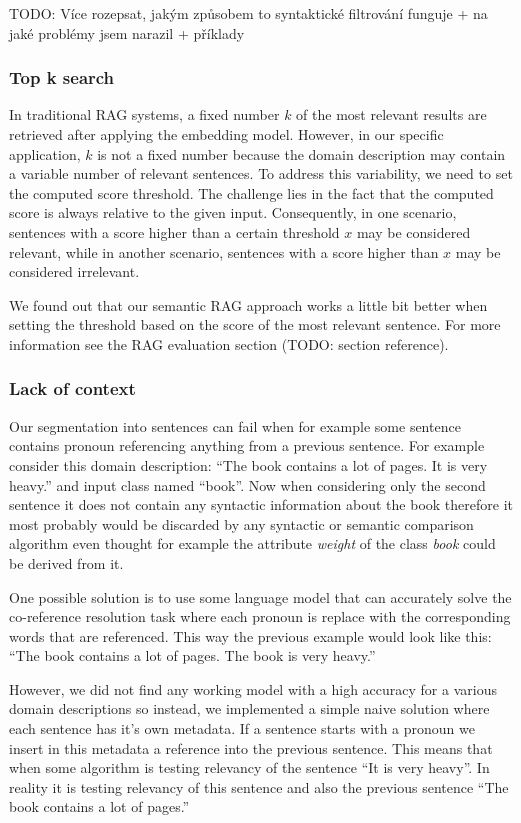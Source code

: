 TODO: Více rozepsat, jakým způsobem to syntaktické filtrování funguje + na jaké problémy jsem narazil + příklady


\subsubsection{Top k search}

In traditional RAG systems, a fixed number $k$ of the most relevant results are retrieved after applying the embedding model. However, in our specific application, $k$ is not a fixed number because the domain description may contain a variable number of relevant sentences. To address this variability, we need to set the computed score threshold. The challenge lies in the fact that the computed score is always relative to the given input. Consequently, in one scenario, sentences with a score higher than a certain threshold $x$ may be considered relevant, while in another scenario, sentences with a score higher than $x$ may be considered irrelevant.

We found out that our semantic RAG approach works a little bit better when setting the threshold based on the score of the most relevant sentence. For more information see the RAG evaluation section (TODO: section reference).


\subsubsection{Lack of context}

Our segmentation into sentences can fail when for example some sentence contains pronoun referencing anything from a previous sentence. For example consider this domain description: ``The book contains a lot of pages. It is very heavy.'' and input class named ``book''. Now when considering only the second sentence it does not contain any syntactic information about the book therefore it most probably would be discarded by any syntactic or semantic comparison algorithm even thought for example the attribute \textit{weight} of the class \textit{book} could be derived from it.

One possible solution is to use some language model that can accurately solve the co-reference resolution task where each pronoun is replace with the corresponding words that are referenced. This way the previous example would look like this: ``The book contains a lot of pages. The book is very heavy.''

However, we did not find any working model with a high accuracy for a various domain descriptions so instead, we implemented a simple naive solution where each sentence has it's own metadata. If a sentence starts with a pronoun we insert in this metadata a reference into the previous sentence. This means that when some algorithm is testing relevancy of the sentence ``It is very heavy''. In reality it is testing relevancy of this sentence and also the previous sentence ``The book contains a lot of pages.''

